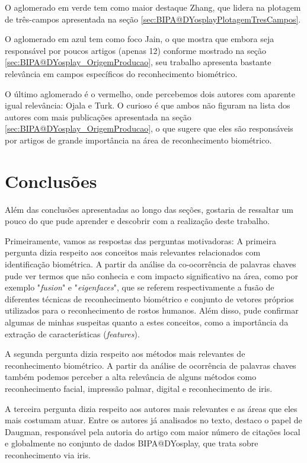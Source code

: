 O aglomerado em verde tem como maior destaque Zhang, que lidera na plotagem de três-campos apresentada na seção \ref{sec:BIPA@DYosplayPlotagemTresCampos}.

O aglomerado em azul tem como foco Jain, o que mostra que embora seja responsável por poucos artigos (apenas 12) conforme mostrado na seção \ref{sec:BIPA@DYosplay_OrigemProducao}, seu trabalho apresenta bastante relevância em campos específicos do reconhecimento biométrico.

O último aglomerado é o vermelho, onde percebemos dois autores com aparente igual relevância: Ojala e Turk. O curioso é que ambos não figuram na lista dos autores com mais publicações apresentada na seção \ref{sec:BIPA@DYosplay_OrigemProducao}, o que sugere que eles são responsáveis por artigos de grande importância na área de reconhecimento biométrico.

\section{Conclusões}
Além das conclusões apresentadas ao longo das seções, gostaria de ressaltar um pouco do que pude aprender e descobrir com a realização deste trabalho.

Primeiramente, vamos as respostas das perguntas motivadoras:
A primeira pergunta dizia respeito aos conceitos mais relevantes relacionados com identificação biométrica. A partir da análise da co-ocorrência de palavras chaves pude ver termos que não conhecia e com impacto significativo na área, como por exemplo "\textit{fusion}" e "\textit{eigenfaces}", que se referem respectivamente a fusão de diferentes técnicas de reconhecimento biométrico e conjunto de vetores próprios utilizados para o reconhecimento de rostos humanos. Além disso, pude confirmar algumas de minhas suspeitas quanto a estes conceitos, como a importância da extração de características (\textit{features}).

A segunda pergunta dizia respeito aos métodos mais relevantes de reconhecimento biométrico. A partir da análise de ocorrência de palavras chaves também podemos perceber a alta relevância de alguns métodos como  reconhecimento facial, impressão palmar, digital e reconhecimento de iris.

A terceira pergunta dizia respeito aos autores mais relevantes e as áreas que eles mais costumam atuar. Entre os autores já analisados no texto, destaco o papel de Daugman, responsável pela autoria do artigo com maior número de citações local e globalmente no conjunto de dados BIPA@DYosplay, que trata sobre reconhecimento via iris.

